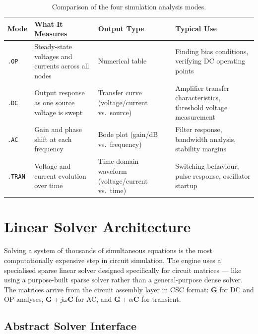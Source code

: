 \begin{table}[h]
\centering
\begin{tabularx}{\textwidth}{l>{\raggedright\arraybackslash}X>{\raggedright\arraybackslash}X>{\raggedright\arraybackslash}X}
\toprule
Mode & What It Measures & Output Type & Typical Use \\
\midrule
\texttt{.OP} & Steady-state voltages and currents across all nodes & Numerical table & Finding bias conditions, verifying DC operating points \\
\texttt{.DC} & Output response as one source voltage is swept & Transfer curve (voltage/current vs.~source) & Amplifier transfer characteristics, threshold voltage measurement \\
\texttt{.AC} & Gain and phase shift at each frequency & Bode plot (gain/dB vs.~frequency) & Filter response, bandwidth analysis, stability margins \\
\texttt{.TRAN} & Voltage and current evolution over time & Time-domain waveform (voltage/current vs.~time) & Switching behaviour, pulse response, oscillator startup \\
\bottomrule
\end{tabularx}
\caption{Comparison of the four simulation analysis modes.}
\end{table}

\section{Linear Solver Architecture}

Solving a system of thousands of simultaneous equations is the most computationally expensive step in circuit simulation. The engine uses a specialised sparse linear solver designed specifically for circuit matrices --- like using a purpose-built sparse solver rather than a general-purpose dense solver. The matrices arrive from the circuit assembly layer in CSC format: $\mathbf{G}$ for DC and OP analyses, $\mathbf{G} + j\omega\mathbf{C}$ for AC, and $\mathbf{G} + \alpha\mathbf{C}$ for transient.

\subsection{Abstract Solver Interface}

